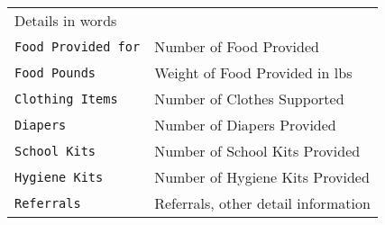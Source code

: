 \documentclass[]{article}
\begin{document}
\begin{longtable}[]{@{}ll@{}}
\begin{minipage}[t]{0.65\columnwidth}
Details in words\strut
\end{minipage}\tabularnewline
\begin{minipage}[t]{0.29\columnwidth}\raggedright
\texttt{Food\ Provided\ for}\strut
\end{minipage} & \begin{minipage}[t]{0.65\columnwidth}\raggedright
Number of Food Provided\strut
\end{minipage}\tabularnewline
\begin{minipage}[t]{0.29\columnwidth}\raggedright
\texttt{Food\ Pounds}\strut
\end{minipage} & \begin{minipage}[t]{0.65\columnwidth}\raggedright
Weight of Food Provided in lbs\strut
\end{minipage}\tabularnewline
\begin{minipage}[t]{0.29\columnwidth}\raggedright
\texttt{Clothing\ Items}\strut
\end{minipage} & \begin{minipage}[t]{0.65\columnwidth}\raggedright
Number of Clothes Supported\strut
\end{minipage}\tabularnewline
\begin{minipage}[t]{0.29\columnwidth}\raggedright
\texttt{Diapers}\strut
\end{minipage} & \begin{minipage}[t]{0.65\columnwidth}\raggedright
Number of Diapers Provided\strut
\end{minipage}\tabularnewline
\begin{minipage}[t]{0.29\columnwidth}\raggedright
\texttt{School\ Kits}\strut
\end{minipage} & \begin{minipage}[t]{0.65\columnwidth}\raggedright
Number of School Kits Provided\strut
\end{minipage}\tabularnewline
\begin{minipage}[t]{0.29\columnwidth}\raggedright
\texttt{Hygiene\ Kits}\strut
\end{minipage} & \begin{minipage}[t]{0.65\columnwidth}\raggedright
Number of Hygiene Kits Provided\strut
\end{minipage}\tabularnewline
\begin{minipage}[t]{0.29\columnwidth}\raggedright
\texttt{Referrals}\strut
\end{minipage} & \begin{minipage}[t]{0.65\columnwidth}\raggedright
Referrals, other detail information\strut

\end{minipage}
\end{longtable}
\end{document}

